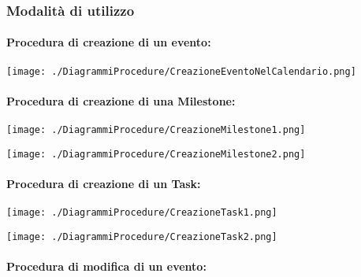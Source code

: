 \newpage
\subsubsection{Modalità di utilizzo} \label{sec:procedure_teamwork}

\paragraph{Procedura di creazione di un evento:}

\begin{center}
	\texttt{[image: ./DiagrammiProcedure/CreazioneEventoNelCalendario.png]}
\end{center}

\paragraph{Procedura di creazione di una Milestone:}

\begin{center}
	\texttt{[image: ./DiagrammiProcedure/CreazioneMilestone1.png]}
\end{center}

\begin{center}
	\texttt{[image: ./DiagrammiProcedure/CreazioneMilestone2.png]}
\end{center}

\newpage
\paragraph{Procedura di creazione di un Task:}

\begin{center}
	\texttt{[image: ./DiagrammiProcedure/CreazioneTask1.png]}
\end{center}

\begin{center}
	\texttt{[image: ./DiagrammiProcedure/CreazioneTask2.png]}
\end{center}

\newpage
\paragraph{Procedura di modifica di un evento:}

